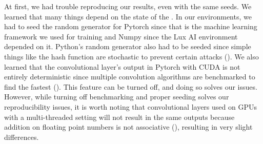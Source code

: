 \bigskip

\noindent At first, we had trouble reproducing our results, even with the same seeds. We learned that many things depend on the state of the . In our environments, we had to seed the random generator for Pytorch since that is the machine learning framework we used for training and Numpy since the Lux AI environment depended on it. Python's random generator also had to be seeded since simple things like the hash function are stochastic to prevent certain attacks (\cite{stackoverflow_answer_27522708}). We also learned that the convolutional layer's output in Pytorch with CUDA is not entirely deterministic since multiple convolution algorithms are benchmarked to find the fastest (\cite{pytorch_randomness}). This feature can be turned off, and doing so solves our issues. However, while turning off benchmarking and proper seeding solves our reproducibility issues, it is worth noting that convolutional layers used on GPUs with a multi-threaded setting will not result in the same outputs because addition on floating point numbers is not associative (\cite{oracle_goldberg}), resulting in very slight differences.

\bigskip

